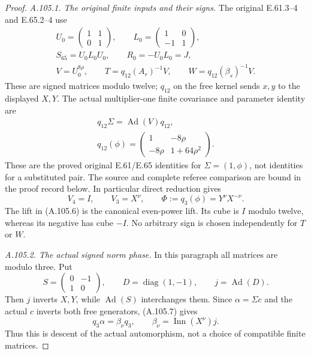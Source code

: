 \begin{proof}
\emph{A.105.1. The original finite inputs and their signs.}
The original E.61.3--4 and E.65.2--4 use
\[
\begin{gathered}
 U_0=\begin{pmatrix}1&1\\0&1\end{pmatrix},\qquad
 L_0=\begin{pmatrix}1&0\\-1&1\end{pmatrix},\\
 S_{65}=U_0L_0U_0,\qquad R_0=-U_0L_0=J,\\
 V=U_0^{8\rho},\qquad
 T=q_{12}(A_r)^{-1}V,\qquad
 W=q_{12}(\beta_s)^{-1}V.
\end{gathered}
\tag{A.105.6}
\]
These are signed matrices modulo twelve; \(q_{12}\) on the free
kernel sends \(x,y\) to the displayed \(X,Y\). The actual
multiplier-one finite covariance and parameter identity are
\[
\begin{gathered}
 q_{12}\Sigma=\operatorname{Ad}(V)q_{12},\\
 q_{12}(\phi)=
 \begin{pmatrix}1&-8\rho\\-8\rho&1+64\rho^2\end{pmatrix}.
\end{gathered}
\tag{A.105.7}
\]
These are the proved original E.61/E.65 identities for
\(\Sigma=(1,\phi)\), not identities for a substituted pair.
The source and complete referee comparison are bound in the
proof record below. In particular direct reduction gives
\[
 V_4=I,\qquad V_3=X^\nu,\qquad
 \Phi:=q_3(\phi)=Y^\nu X^{-\nu}.
\tag{A.105.8}
\]
The lift in (A.105.6) is the canonical even-power lift. Its cube
is \(I\) modulo twelve, whereas its negative has cube \(-I\).
No arbitrary sign is chosen independently for \(T\) or \(W\).

\emph{A.105.2. The actual signed norm phase.}
In this paragraph all matrices are modulo three. Put
\[
 S=\begin{pmatrix}0&-1\\1&0\end{pmatrix},\qquad
 D=\operatorname{diag}(1,-1),\qquad j=\operatorname{Ad}(D).
\]
Then \(j\) inverts \(X,Y\), while \(\operatorname{Ad}(S)\)
interchanges them. Since \(\alpha=\Sigma c\) and the actual
\(c\) inverts both free generators, (A.105.7) gives
\[
 q_3\alpha=\beta_\nu q_3,\qquad
 \beta_\nu=\operatorname{Inn}(X^\nu)j.
\tag{A.105.9}
\]
Thus this is descent of the actual automorphism, not a choice
of compatible finite matrices.


\end{proof}
